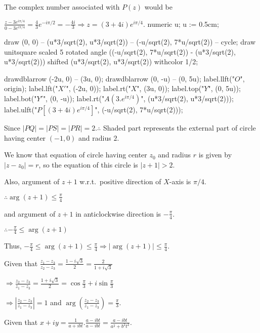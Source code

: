   The complex number associated with $P(z)$ would be

  $\frac{z - 3e^{i\pi/4}}{0 - 3e^{i\pi/4}} = \frac{4}{3}e^{-i\pi/2} = -\frac{4i}{3}\Rightarrow z = (3 +
  4i)e^{i\pi/4}$.
  \startplacefigure[location=force]
    \startMPcode
      numeric u;
      u := 0.5cm;

      draw (0, 0) -- (u*3/sqrt(2), u*3/sqrt(2)) -- (-u/sqrt(2), 7*u/sqrt(2)) -- cycle;
      draw unitsquare scaled 5 rotated angle ((-u/sqrt(2), 7*u/sqrt(2)) - (u*3/sqrt(2), u*3/sqrt(2)))
      shifted (u*3/sqrt(2), u*3/sqrt(2)) withcolor 1/2;

      drawdblarrow (-2u, 0) -- (3u, 0);
      drawdblarrow (0, -u) -- (0, 5u);
      label.llft("$O$", origin);
      label.lft("$X'$", (-2u, 0));
      label.rt("$X$", (3u, 0));
      label.top("$Y$", (0, 5u));
      label.bot("$Y'$", (0, -u));
      label.rt("$A(3.e^{i\pi/4})$", (u*3/sqrt(2), u*3/sqrt(2)));
      label.ulft("$P[(3 + 4i)e^{i\pi/4}]$", (-u/sqrt(2), 7*u/sqrt(2)));
    \stopMPcode
  \stopplacefigure
\item Since $|PQ| = |PS| = |PR| = 2. \therefore$ Shaded part represents the external part of circle having
  center $(-1, 0)$ and radius $2$.

  We know that equation of circle having center $z_0$ and radius $r$ is given by $|z - z_0| = r$, so the
  equation of this circle is $|z + 1|> 2$.

  Also, argument of $z + 1$ w.r.t.\ positive direction of $X$-axis is $\pi/4$.

  $\therefore \arg(z + 1)\leq \frac{\pi}{4}$

  and argument of $z + 1$ in anticlockwise direction is $-\frac{\pi}{4}$.

  $\therefore -\frac{\pi}{4}\leq\arg(z + 1)$

  Thus, $-\frac{\pi}{4}\leq \arg(z + 1)\leq \frac{\pi}{4}\Rightarrow |\arg(z + 1)|\leq \frac{\pi}{4}$.
\item Given that $\frac{z_1 - z_3}{z_2 - z_3} = \frac{1 - i\sqrt{3}}{2} = \frac{2}{1 + i\sqrt{3}}$

  $\Rightarrow \frac{z_2 - z_3}{z_1 - z_3} = \frac{1 + i\sqrt{3}}{2} = \cos\frac{\pi}{3} +
  i\sin\frac{\pi}{3}$

  $\Rightarrow \left|\frac{z_2 - z_3}{z_1 - z_3}\right| = 1$ and $\arg\left(\frac{z_2 - z_3}{z_1 -
    z_3}\right) = \frac{\pi}{3}$.
\item Given that $x + iy = \frac{1}{a + ibt}.\frac{a - ibt}{a - ibt} = \frac{a - ibt}{a^2 + b^2t^2}$.

